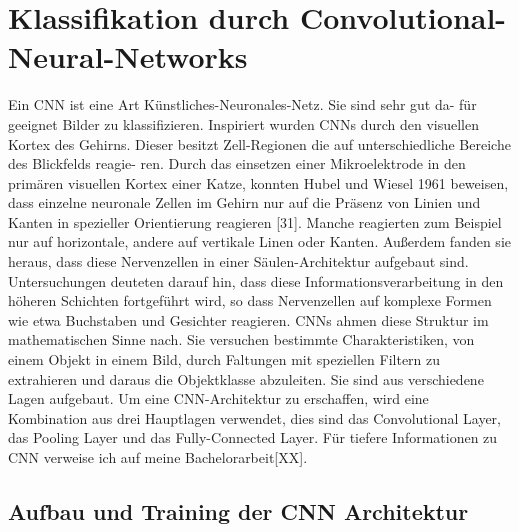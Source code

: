 {{{{{{{{\begin{center}
\end{center}


\section{Klassifikation durch Convolutional-Neural-Networks}
\label{sec:Klassifikation durch Convolutional-Neural-Networks}

Ein CNN ist eine Art K\"unstliches-Neuronales-Netz. Sie sind sehr gut da-
f\"ur geeignet Bilder zu klassifizieren. Inspiriert wurden CNNs durch den visuellen Kortex des Gehirns. Dieser besitzt Zell-Regionen die auf unterschiedliche Bereiche des Blickfelds reagie-
ren. Durch das einsetzen einer Mikroelektrode in den prim\"aren visuellen Kortex einer Katze,
konnten Hubel und Wiesel 1961 beweisen, dass einzelne neuronale Zellen im Gehirn nur auf die
Pr\"asenz von Linien und Kanten in spezieller Orientierung reagieren [31]. Manche reagierten
zum Beispiel nur auf horizontale, andere auf vertikale Linen oder Kanten. Au{\ss}erdem fanden sie
heraus, dass diese Nervenzellen in einer S\"aulen-Architektur aufgebaut sind. Untersuchungen
deuteten darauf hin, dass diese Informationsverarbeitung in den h\"oheren Schichten fortgef\"uhrt
wird, so dass Nervenzellen auf komplexe Formen wie etwa Buchstaben und Gesichter reagieren. CNNs ahmen diese Struktur im mathematischen Sinne nach. Sie versuchen bestimmte
Charakteristiken, von einem Objekt in einem Bild, durch Faltungen mit speziellen Filtern zu
extrahieren und daraus die Objektklasse abzuleiten. Sie sind aus verschiedene Lagen aufgebaut. Um eine CNN-Architektur zu erschaffen, wird eine Kombination aus drei Hauptlagen
verwendet, dies sind das Convolutional Layer, das Pooling Layer und das Fully-Connected
Layer. F\"ur tiefere Informationen zu CNN verweise ich auf meine Bachelorarbeit[XX].


\subsection{Aufbau und Training der CNN Architektur}
\label{subsec:Aufbau und Training der CNN Architektur}

}}}}}}}}
